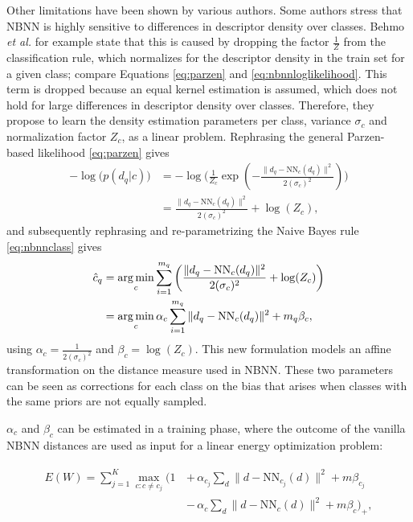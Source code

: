 Other limitations have been shown by various authors.\cite{behmo2010towards, wang2011improved,mccann2012local,tuytelaars2011nbnn,timofte2012iterative} Some authors \cite{behmo2010towards,wang2011improved} stress that NBNN is highly sensitive to differences in descriptor density over classes. Behmo \emph{et al.} for example state that this is caused by dropping the factor $\frac{1}{Z}$ from the classification rule, which normalizes for the descriptor density in the train set for a given class; compare Equations \eqref{eq:parzen} and \eqref{eq:nbnnloglikelihood}. This term is dropped because an equal kernel estimation is assumed, which does not hold for large differences in descriptor density over classes.\cite{behmo2010towards} Therefore, they propose to learn the density estimation parameters per class, variance $\sigma_c$ and normalization factor $Z_c$, as a linear problem. Rephrasing the general Parzen-based likelihood \eqref{eq:parzen} gives
\begin{align}
    - \log\big(p(d_q|c)\big) &= -\log\Bigg(\frac{1}{ Z_c}\exp\left( -\frac{ \|d_q - \text{NN}_c(d_q)\|^2}{2(\sigma_c)^2}\right)\!\Bigg) \\
    &= \frac{ \|d_q - \text{NN}_c(d_q)\|^2}{2(\sigma_c)^2} + \log(Z_c),
\end{align}
and subsequently rephrasing and re-parametrizing the Naive Bayes rule \eqref{eq:nbnnclass} gives
\begin{align}
    \hat c_q &= \operatorname*{arg\,min}_c \sum_{i=1}^{m_q} \left(\frac{ \|d_q - \text{NN}_c(d_q)\|^2}{2(\sigma_c)^2} + \log(Z_c)\right)\\
    &= \operatorname*{arg\,min}_c \alpha_c \sum_{i=1}^{m_q} \|d_q - \text{NN}_c(d_q)\|^2 + m_q\beta_c,
\end{align}
using $\alpha_c = \frac{1}{2(\sigma_c)^2}$ and $\beta_c = \log(Z_c)$. This new formulation models an affine transformation on the distance measure used in NBNN. These two parameters can be seen as corrections for each class on the bias that arises when classes with the same priors are not equally sampled.

$\alpha_c$ and $\beta_c$ can be estimated in a training phase, where the outcome of the vanilla NBNN distances are used as input for a linear energy optimization problem:

\begin{align}\begin{split} \label{eq:energy}
    E(W) = \sum_{j=1}^{K} \max_{c:c\neq c_j} \Big(1\,&+\,\alpha_{c_j} \sum_d \|d - \text{NN}_{c_j}(d)\|^2 + m\beta_{c_j}\\
    &-\,\alpha_{c} \sum_d \|d - \text{NN}_{c}(d)\|^2 + m\beta_{c}\Big)_{+},
\end{split}\end{align}


